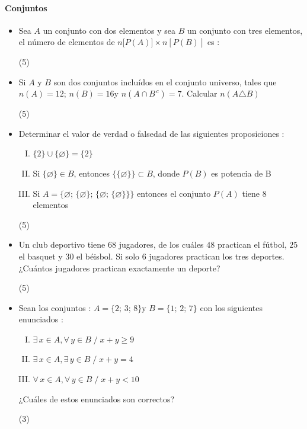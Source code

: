 \documentclass[12pt, twocolumn, landscape, a4paper]{article}
\begin{document}
\paragraph*{Conjuntos}

\begin{itemize}
\item{Sea $A$ un conjunto con dos elementos y sea $B$ un conjunto con tres elementos, el número de elementos de $n\big[P(A)\big]\times n[P(B)]$ es :
\begin{tasks}(5)
\end{tasks}
}
\item{Si $A$ y $B$ son dos conjuntos incluídos en el conjunto universo, tales que $n(A) = 12$; \quad$n(B) = 16$\quad y \quad$n(A \cap B^{\,c}) = 7$. \quad Calcular $n(A\triangle B)$

\begin{tasks}(5)
\end{tasks}} 
\item{Determinar el valor de verdad o falsedad de las siguientes proposiciones :
\begin{enumerate}[I.]
\item{$\{2\} \cup \{\varnothing\} = \{2\}$} %
\item{Si $\{\varnothing\} \in B$, entonces $\{\{\varnothing\}\} \subset B$, donde $P(B)$ es potencia de B }
\item{Si $A = \{\varnothing;\,\{\varnothing\};\,\{\varnothing;\,\{\varnothing\}\}\}$ entonces el conjunto $P(A)$ tiene 8 elementos}
\end{enumerate}  
\begin{tasks}(5)
\end{tasks}} 
\item{Un club deportivo tiene $68$ jugadores, de los cuáles $48$ practican el fútbol, $25$ el basquet y $30$ el béisbol. Si solo $6$ jugadores practican los tres deportes. ¿Cuántos jugadores practican exactamente un deporte? 
\begin{tasks}(5)
\end{tasks}}
\item{Sean los conjuntos : $A = \{2;\,3;\,8\}$\quad y \quad$B = \{1;\,2;\,7\}$ con los siguientes enunciados :
\begin{enumerate}[I.]
\item{$\exists\,x \in A, \forall\,y \in B\;/\; x + y \geq 9$}
\item{$\exists\,x \in A, \exists\,y \in B\;/\; x + y = 4$}
\item{$\forall\,x \in A, \forall\,y \in B\;/\; x + y < 10$}
\end{enumerate}
¿Cuáles de estos enunciados son correctos? 
\begin{tasks}(3)
\end{tasks}}
\end{itemize}
\end{document}
